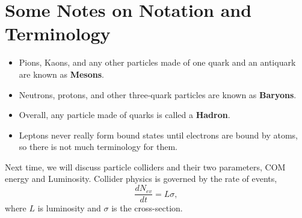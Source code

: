 \documentclass[relqm.tex]{subfiles}
\begin{document}
\section{Some Notes on Notation and Terminology}
\begin{itemize}
    \item Pions, Kaons, and any other particles made of one quark and an antiquark are known as \textbf{Mesons}.
    \item Neutrons, protons, and other three-quark particles are known as \textbf{Baryons}.
    \item Overall, any particle made of quarks is called a \textbf{Hadron}.
    \item Leptons never really form bound states until electrons are bound by atoms, so there is not much terminology for them. 
\end{itemize}
Next time, we will discuss particle colliders and their two parameters, COM energy and Luminosity. 
Collider physics is governed by the rate of events,
\begin{equation}
    \frac{dN_{ev}}{dt} = L\sigma,
\end{equation}
where $L$ is luminosity and $\sigma$ is the cross-section.
\end{document}
